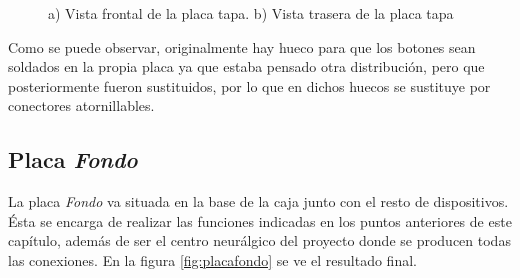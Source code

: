 \begin{figure}[htpb]%
    \centering 
    \hspace{10pt}%
    \caption{a) Vista frontal de la placa tapa. b) Vista trasera de la placa tapa}
    \label{fig:placatapa} 
    \end{figure} 

Como se puede observar, originalmente hay hueco para que los botones sean soldados en la propia placa ya 
que estaba pensado otra distribución, pero que posteriormente fueron sustituidos, por lo que en dichos 
huecos se sustituye por conectores atornillables.
    
\subsection{Placa \textit{Fondo}}

La placa \textit{Fondo} va situada en la base de la caja junto con el resto de dispositivos. Ésta se encarga
de realizar las funciones indicadas en los puntos anteriores de este capítulo, además de ser el centro neurálgico
del proyecto donde se producen todas las conexiones. En la figura \ref{fig:placafondo} se ve el resultado final.

